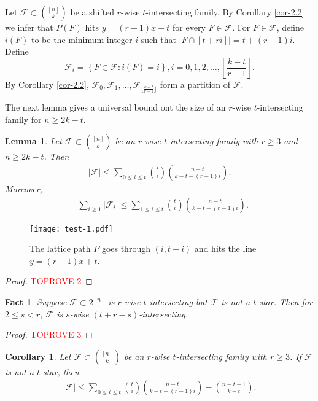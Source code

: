 \documentclass[11pt,a4paper]{article}
\newtheorem{lem}[thm]{Lemma}
\newtheorem{false statement}{False statement}
\newtheorem{cor}[thm]{Corollary}
\newtheorem{fact}[thm]{Fact}
\theoremstyle{definition}
\def\hf{\mathcal{F}}
\begin{document}
Let $\hf\subset \binom{[n]}{k}$ be a shifted $r$-wise $t$-intersecting family. By Corollary \ref{cor-2.2} we infer that $P(F)$ hits $y=(r-1)x+t$ for every $F\in \hf$. For $F\in \hf$, define $i(F)$ to be the minimum integer $i$ such that $|F\cap [t+ri]|=t+(r-1)i$. Define
\[
\hf_i= \left\{F\in \hf\colon  i(F)=i \right\}, i=0,1,2,\ldots, \left\lfloor \frac{k-t}{r-1}\right\rfloor.
\]
By Corollary \ref{cor-2.2}, $\hf_0,\hf_1,\ldots,\hf_{\lfloor \frac{k-t}{r-1}\rfloor}$ form  a partition of $\hf$.

The next lemma gives a universal bound ont the size of an $r$-wise $t$-intersecting family for $n\geq 2k-t$.

\begin{lem}
Let  $\hf\subset \binom{[n]}{k}$ be an $r$-wise $t$-intersecting family with $r\geq 3$ and $n\geq 2k-t$. Then
\begin{align}
|\hf|   \leq \sum_{0\leq i\leq t} \binom{t}{i}\binom{n-t}{k-t-(r-1)i}.\label{ineq-key0}
\end{align}
Moreover,
\begin{align}
&\sum_{i\geq 1} |\hf_i|   \leq \sum_{1\leq i\leq t} \binom{t}{i}\binom{n-t}{k-t-(r-1)i}.\label{ineq-key1}
\end{align}
\end{lem}


 \begin{figure}[t]
  \centering
  \texttt{[image: test-1.pdf]}
  \caption{The lattice path $P$ goes through $(i,t-i)$ and hits the line $y=(r-1)x+t$.}\label{latticepath}
\end{figure}

\begin{proof}\textcolor{red}{TOPROVE 2}\end{proof}

\begin{fact}\label{fact-3.1}
Suppose $\hf\subset 2^{[n]}$ is $r$-wise $t$-intersecting but $\hf$ is not a $t$-star. Then for $2\leq s<r$, $\hf$ is $s$-wise $(t+r-s)$-intersecting.
\end{fact}
\begin{proof}\textcolor{red}{TOPROVE 3}\end{proof}


\begin{cor}
Let $\hf\subset \binom{[n]}{k}$ be an $r$-wise $t$-intersecting family with $r\geq 3$. If $\hf$ is not a $t$-star, then
\begin{align}\label{ineq-key2}
|\hf|   \leq \sum_{0\leq i\leq t} \binom{t}{i}\binom{n-t}{k-t-(r-1)i} - \binom{n-t-1}{k-t}.
\end{align}
\end{cor}
\end{document}
